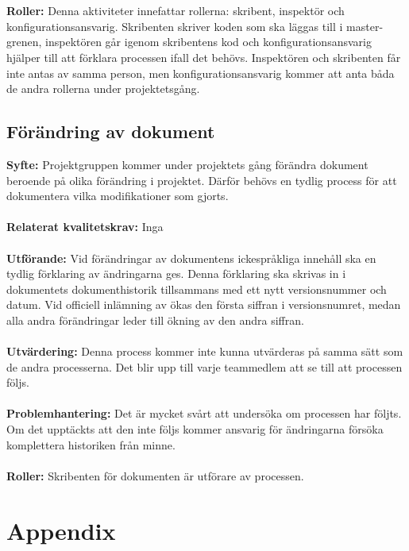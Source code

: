 \documentclass[10pt]{article}
\begin{document}
	\\\\
	\textbf{Roller:} Denna aktiviteter innefattar rollerna: skribent, inspektör och konfigurationsansvarig. Skribenten skriver koden som ska läggas till i master-grenen, inspektören går igenom skribentens kod och konfigurationsansvarig hjälper till att förklara processen ifall det behövs. Inspektören och skribenten får inte antas av samma person, men konfigurationsansvarig kommer att anta båda de andra rollerna under projektetsgång.

	\subsection{Förändring av dokument}
	\textbf{Syfte:} Projektgruppen kommer under projektets gång förändra dokument beroende på olika förändring i projektet. Därför behövs en tydlig process för att dokumentera vilka modifikationer som gjorts.
	\\\\
	\textbf{Relaterat kvalitetskrav:} Inga
	\\\\
	\textbf{Utförande:} Vid förändringar av dokumentens ickespråkliga innehåll ska en tydlig förklaring av ändringarna ges. Denna förklaring ska skrivas in i dokumentets dokumenthistorik tillsammans med ett nytt versionsnummer och datum. Vid officiell inlämning av ökas den första siffran i versionsnumret, medan alla andra förändringar leder till ökning av den andra siffran. 
	\\\\
	\textbf{Utvärdering:} Denna process kommer inte kunna utvärderas på samma sätt som de andra processerna. Det blir upp till varje teammedlem att se till att processen följs. 
	\\\\
	\textbf{Problemhantering:} Det är mycket svårt att undersöka om processen har följts. Om det upptäckts att den inte följs kommer ansvarig för ändringarna försöka komplettera historiken från minne.
	\\\\
	\textbf{Roller:} Skribenten för dokumenten är utförare av processen.
	
	
\pagebreak
\section*{Appendix}
\end{document}
